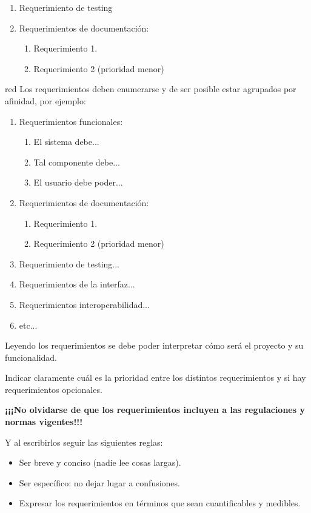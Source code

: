 \documentclass[
11pt, %
codirector, %
]{charter}
\begin{document}
\begin{enumerate}
	\item Requerimiento de testing
	\item Requerimientos de documentación:
		\begin{enumerate}
			\item Requerimiento 1.
			\item Requerimiento 2 (prioridad menor)
		\end{enumerate}

\end{enumerate}


\begin{consigna}{red}
Los requerimientos deben enumerarse y de ser posible estar agrupados por afinidad, por ejemplo:

\begin{enumerate}
	\item Requerimientos funcionales:
		\begin{enumerate}
			\item El sistema debe...
			\item Tal componente debe...
			\item El usuario debe poder...
		\end{enumerate}
	\item Requerimientos de documentación:
		\begin{enumerate}
			\item Requerimiento 1.
			\item Requerimiento 2 (prioridad menor)
		\end{enumerate}
	\item Requerimiento de testing...
	\item Requerimientos de la interfaz...
	\item Requerimientos interoperabilidad...
	\item etc...
\end{enumerate}

Leyendo los requerimientos se debe poder interpretar cómo será el proyecto y su funcionalidad.

Indicar claramente cuál es la prioridad entre los distintos requerimientos y si hay requerimientos opcionales. 

\textbf{¡¡¡No olvidarse de que los requerimientos incluyen a las regulaciones y normas vigentes!!!}

Y al escribirlos seguir las siguientes reglas:
\begin{itemize}
	\item Ser breve y conciso (nadie lee cosas largas). 
	\item Ser específico: no dejar lugar a confusiones.
	\item Expresar los requerimientos en términos que sean cuantificables y medibles.
\end{itemize}

\end{consigna}
\end{document}
